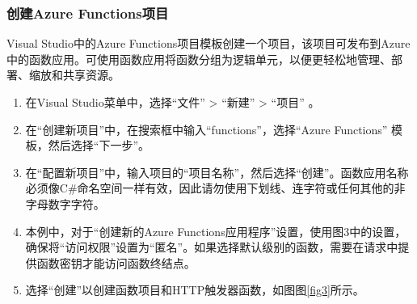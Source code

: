 \documentclass[11pt]{article}
\begin{document}
\subsubsection{创建Azure Functions项目} 
Visual Studio中的Azure Functions项目模板创建一个项目，该项目可发布到Azure中的函数应用。可使用函数应用将函数分组为逻辑单元，以便更轻松地管理、部署、缩放和共享资源。
\begin{enumerate}
	\item 在Visual Studio菜单中，选择“文件” > “新建” > “项目” 。
	\item 在“创建新项目”中，在搜索框中输入“functions”，选择“Azure Functions” 模板，然后选择“下一步”。
	\item 在“配置新项目”中，输入项目的“项目名称”，然后选择“创建”。函数应用名称必须像C\#命名空间一样有效，因此请勿使用下划线、连字符或任何其他的非字母数字字符。
	\item 本例中，对于“创建新的Azure Functions应用程序”设置，使用图3中的设置，确保将“访问权限”设置为“匿名”。如果选择默认级别的函数，需要在请求中提供函数密钥才能访问函数终结点。
	\item 选择“创建”以创建函数项目和HTTP触发器函数，如图图\ref{fig3}所示。
\end{enumerate}
\end{document}
